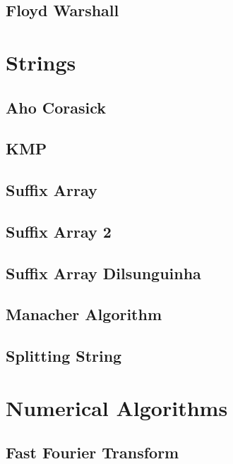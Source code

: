 \subsection{Floyd Warshall}
\raggedbottom
\hrulefill

\section{Strings}
\subsection{Aho Corasick}
\raggedbottom
\hrulefill
\subsection{KMP}
\raggedbottom
\hrulefill
\subsection{Suffix Array}
\raggedbottom
\hrulefill
\subsection{Suffix Array 2}
\raggedbottom
\hrulefill
\subsection{Suffix Array Dilsunguinha}
\raggedbottom
\hrulefill
\subsection{Manacher Algorithm}
\raggedbottom
\hrulefill
\subsection{Splitting String}
\raggedbottom
\hrulefill

\section{Numerical Algorithms}
\subsection{Fast Fourier Transform}
\raggedbottom
\hrulefill
